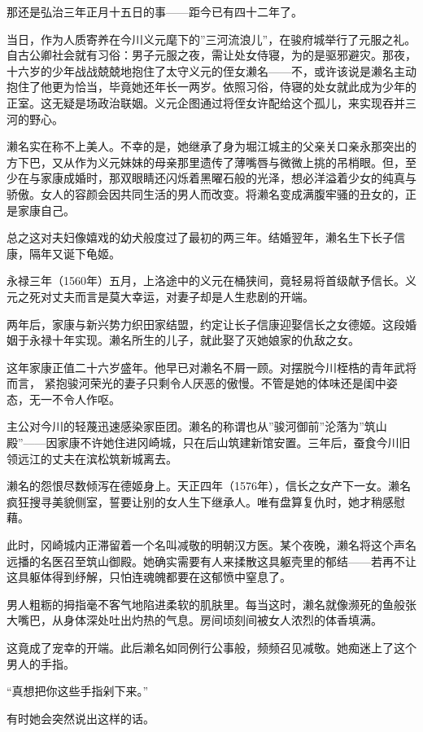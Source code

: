 \documentclass[
]{book}
\begin{document}
那还是弘治三年正月十五日的事------距今已有四十二年了。

当日，作为人质寄养在今川义元麾下的''三河流浪儿''，在骏府城举行了元服之礼。自古公卿社会就有习俗：男子元服之夜，需让处女侍寝，为的是驱邪避灾。那夜，十六岁的少年战战兢兢地抱住了太守义元的侄女濑名------不，或许该说是濑名主动抱住了他更为恰当，毕竟她还年长一两岁。依照习俗，侍寝的处女就此成为少年的正室。这无疑是场政治联姻。义元企图通过将侄女许配给这个孤儿，来实现吞并三河的野心。

濑名实在称不上美人。不幸的是，她继承了身为堀江城主的父亲关口亲永那突出的方下巴，又从作为义元妹妹的母亲那里遗传了薄嘴唇与微微上挑的吊梢眼。但，至少在与家康成婚时，那双眼睛还闪烁着黑曜石般的光泽，想必洋溢着少女的纯真与骄傲。女人的容颜会因共同生活的男人而改变。将濑名变成满腹牢骚的丑女的，正是家康自己。

总之这对夫妇像嬉戏的幼犬般度过了最初的两三年。结婚翌年，濑名生下长子信康，隔年又诞下龟姬。

永禄三年（1560年）五月，上洛途中的义元在桶狭间，竟轻易将首级献予信长。义元之死对丈夫而言是莫大幸运，对妻子却是人生悲剧的开端。

两年后，家康与新兴势力织田家结盟，约定让长子信康迎娶信长之女德姬。这段婚姻于永禄十年实现。濑名所生的儿子，就此娶了灭她娘家的仇敌之女。

这年家康正值二十六岁盛年。他早已对濑名不屑一顾。对摆脱今川桎梏的青年武将而言， 紧抱骏河荣光的妻子只剩令人厌恶的傲慢。不管是她的体味还是闺中姿态，无一不令人作呕。

主公对今川的轻蔑迅速感染家臣团。濑名的称谓也从''骏河御前''沦落为''筑山殿''------因家康不许她住进冈崎城，只在后山筑建新馆安置。三年后，蚕食今川旧领远江的丈夫在滨松筑新城离去。

濑名的怨恨尽数倾泻在德姬身上。天正四年（1576年），信长之女产下一女。濑名疯狂搜寻美貌侧室，誓要让别的女人生下继承人。唯有盘算复仇时，她才稍感慰藉。

此时，冈崎城内正滞留着一个名叫减敬的明朝汉方医。某个夜晚，濑名将这个声名远播的名医召至筑山御殿。她确实需要有人来揉散这具躯壳里的郁结------若再不让这具躯体得到纾解，只怕连魂魄都要在这郁愤中窒息了。

男人粗粝的拇指毫不客气地陷进柔软的肌肤里。每当这时，濑名就像濒死的鱼般张大嘴巴，从身体深处吐出灼热的气息。房间顷刻间被女人浓烈的体香填满。

这竟成了宠幸的开端。此后濑名如同例行公事般，频频召见减敬。她痴迷上了这个男人的手指。

``真想把你这些手指剁下来。''

有时她会突然说出这样的话。
\end{document}
